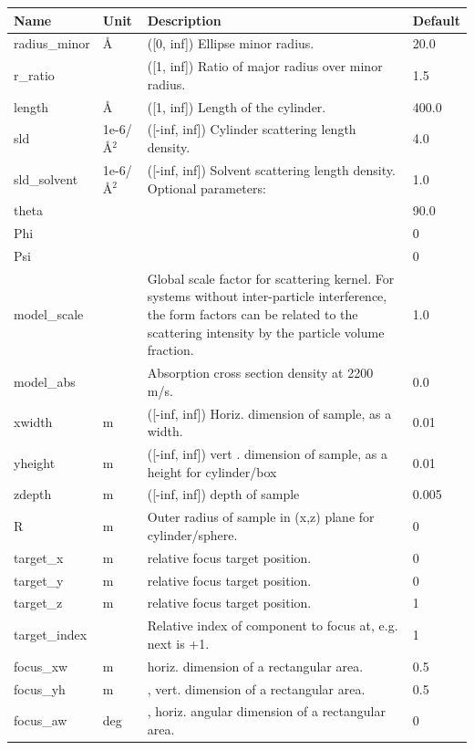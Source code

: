 \begin{longtable}{p{}p{}p{}p{}}
\toprule
\textbf{Name} & \textbf{Unit} & \textbf{Description} & \textbf{Default} \\
\midrule
\endhead
radius\_minor & \AA{} & ([0, inf]) Ellipse minor radius. & 20.0 \\
r\_ratio &  & ([1, inf]) Ratio of major radius over minor radius. & 1.5 \\
length & \AA{} & ([1, inf]) Length of the cylinder. & 400.0 \\
sld & 1e-6/\AA{}$^{2}$ & ([-inf, inf]) Cylinder scattering length density. & 4.0 \\
sld\_solvent & 1e-6/\AA{}$^{2}$ & ([-inf, inf]) Solvent scattering length density. Optional parameters: & 1.0 \\
theta &  &  & 90.0 \\
Phi &  &  & 0 \\
Psi &  &  & 0 \\
model\_scale &   & Global scale factor for scattering kernel. For systems without inter-particle interference, the form factors can be related to the scattering intensity by the particle volume fraction. & 1.0 \\
model\_abs &   & Absorption cross section density at 2200 m/s. & 0.0 \\
xwidth & m & ([-inf, inf]) Horiz. dimension of sample, as a width. & 0.01 \\
yheight & m & ([-inf, inf]) vert . dimension of sample, as a height for cylinder/box & 0.01 \\
zdepth & m & ([-inf, inf]) depth of sample & 0.005 \\
R & m & Outer radius of sample in (x,z) plane for cylinder/sphere. & 0 \\
target\_x & m & relative focus target position. & 0 \\
target\_y & m & relative focus target position. & 0 \\
target\_z & m & relative focus target position. & 1 \\
target\_index &   & Relative index of component to focus at, e.g. next is +1. & 1 \\
focus\_xw & m & horiz. dimension of a rectangular area. & 0.5 \\
focus\_yh & m & , vert. dimension of a rectangular area. & 0.5 \\
focus\_aw & deg & , horiz. angular dimension of a rectangular area. & 0 \\

\end{longtable}
